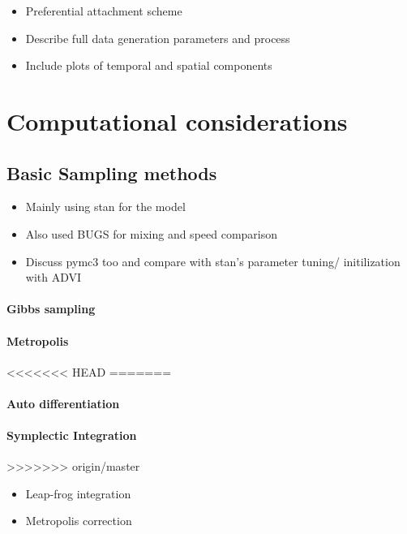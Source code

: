 \documentclass[11pt]{report}
\begin{document}
\begin{itemize}
\item Preferential attachment scheme
\item Describe full data generation parameters and process
\item Include plots of temporal and spatial components
\end{itemize}

\chapter{Computational considerations}

\section{Basic Sampling methods}

\begin{itemize}

\item Mainly using stan for the model

\item Also used BUGS for mixing and speed comparison

\item Discuss pymc3 too and compare with stan's parameter tuning/ initilization with ADVI

\end{itemize}

\subsubsection{Gibbs sampling}

\subsubsection{Metropolis}

<<<<<<< HEAD
=======

\subsubsection{Auto differentiation}

\subsubsection{Symplectic Integration}
>>>>>>> origin/master

\begin{itemize}
\item Leap-frog integration
\item Metropolis correction
\end{itemize}
\end{document}

